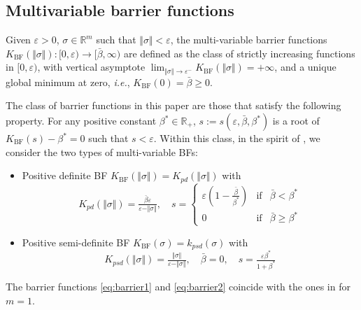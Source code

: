 \documentclass[twocolumn]{autart}    %
\begin{document}
\subsection{Multivariable barrier functions}
\vspace{-3mm}
\begin{defn}\label{def:1} Given $\varepsilon>0$, $\sigma\in \mathbb{R}^{m}$ such that $\Vert \sigma \Vert < \varepsilon$, the multi-variable barrier functions $K_{\mathrm{BF}}(\Vert \sigma \Vert):[0,\varepsilon) \rightarrow [\bar{\beta},\infty)$ are defined as the class of strictly increasing functions in $[0,\varepsilon)$, with vertical asymptote $\lim_{\Vert \sigma  \Vert \rightarrow \varepsilon^{-}} K_{\mathrm{BF}}(\Vert \sigma \Vert)= + \infty$, and a unique global minimum at zero, \textit{i.e.}, $K_{\mathrm{BF}}(0)= \bar{\beta}\geq 0$.
\end{defn}
The class of barrier functions in this paper are those that satisfy the following property. For any positive constant $\beta^{*}\in \mathbb{R}_{+}$, $s:=s(\varepsilon,\bar{\beta},\beta^{*})$ is a root of $K_{\mathrm{BF}}(s)-\beta^{*}=0$ such that $s<\varepsilon$.  Within this class,  in the spirit of \cite{obeid18}, we consider the two types of multi-variable BFs: 
\begin{itemize}
\item Positive definite BF $K_{\mathrm{BF}}(\Vert \sigma \Vert)=K_{pd}(\Vert \sigma \Vert)$ with 
\begin{equation}\label{eq:barrier1}
 K_{pd}(\Vert \sigma \Vert)=\tfrac{\bar{\beta}\varepsilon}{\varepsilon-\Vert \sigma \Vert}, \quad s= \left \{ \begin{matrix} \varepsilon\left(1-\tfrac{\bar{\beta}}{\beta^{*}}\right) & \mathrm{if} & \bar{\beta}<\beta^{*} \\
0 & \mathrm{if} & \bar{\beta}\geq \beta^{*}
\end{matrix}\right.
\end{equation}
\item Positive semi-definite BF $K_{\mathrm{BF}}(\sigma)=k_{psd}(\sigma)$ with
\begin{equation}\label{eq:barrier2}
 K_{psd}(\Vert \sigma \Vert)=\tfrac{\Vert \sigma \Vert}{\varepsilon-\Vert \sigma \Vert}, \quad \bar{\beta}=0,\quad s= \tfrac{\varepsilon \beta^{*}}{1+\beta^{*}}
\end{equation}
\end{itemize}
\begin{rem}
The barrier functions \eqref{eq:barrier1} and \eqref{eq:barrier2} coincide with the ones in \cite{obeid18} for $m=1$.
\end{rem}
\end{document}
